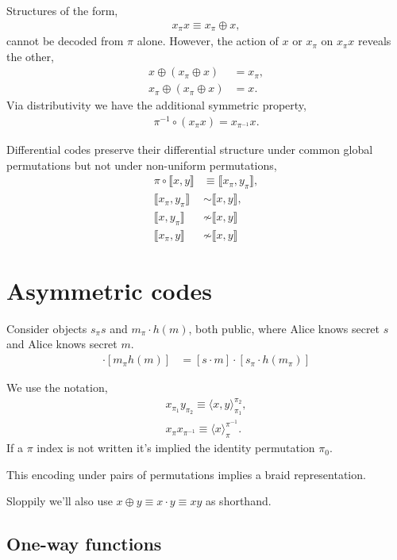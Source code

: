 \documentclass[twocolumn, aps, amsmath, amssymb, nofootinbib, superscriptaddress, longbibliography, doublefloatfix, table-of-contents, eqsecnum, rmp]{revtex4-2}
\def\diff#1#2{\llbracket #1,#2\rrbracket}
\def\braid#1#2#3#4{\langle#1,#2\rangle_{#3}^{#4}}
\def\selfbraid#1#2#3{\langle#1\rangle_{#2}^{#3}}
\begin{document}
Structures of the form,
\begin{align}
	x_\pi x \equiv x_\pi \oplus x,
\end{align}
cannot be decoded from $\pi$ alone. However, the action of $x$ or $x_\pi$ on $x_\pi x$ reveals the other,
\begin{align}
	x \oplus (x_\pi \oplus x) & = x_\pi,\nonumber\\
	x_\pi \oplus (x_\pi \oplus x) &= x.
\end{align}
Via distributivity we have the additional symmetric property,
\begin{align}
	\pi^{-1} \circ (x_\pi x)	 = x_{\pi^{-1}} x.
\end{align}

Differential codes preserve their differential structure under common global permutations but not under non-uniform permutations,
\begin{align}
	\pi\circ \diff{x}{y}	 &\equiv \diff{x_\pi}{y_\pi},\nonumber\\
 	\diff{x_\pi}{y_\pi} &\sim \diff{x}{y},\nonumber\\
	\diff{x}{y_\pi} &\not\sim \diff{x}{y} \nonumber\\
	\diff{x_\pi}{y} &\not\sim \diff{x}{y}
\end{align}

\section{Asymmetric codes}

Consider objects $s_\pi s$ and $m_\pi \cdot h(m)$, both public, where Alice knows secret $s$ and Alice knows secret $m$.
\begin{align}
	[s_\pi s] \cdot [m_\pi h(m)] &= [s \cdot m] \cdot [s_\pi \cdot h(m_\pi)]
\end{align}


We use the notation,
\begin{align}
	x_{\pi_1} y_{\pi_2} \equiv \braid{x}{y}{\pi_1}{\pi_2},\nonumber\\
	x_{\pi} x_{\pi^{-1}} \equiv \selfbraid{x}{\pi}{\pi^{-1}}.
\end{align}
If a $\pi$ index is not written it's implied the identity permutation $\pi_0$.

This encoding under pairs of permutations implies a braid representation.

Sloppily we'll also use $x\oplus y \equiv x \cdot y \equiv xy$ as shorthand.

\subsection{One-way functions}
\end{document}
